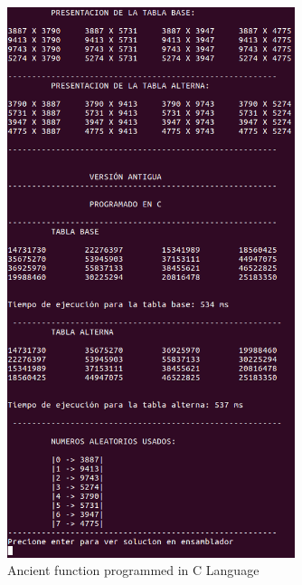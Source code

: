 \documentclass[legalpaper,12pt]{article}
\begin{document}
\begin{figure}[htbp]
  \centering
    \includegraphics[width=0.75\textwidth]{Antigua_C.png}
  \caption{Ancient function programmed in C Language}
  \label{fig:antigua_c}
\end{figure}
\end{document}
